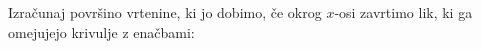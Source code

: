 \documentclass[11pt,a4paper]{exam}
\renewcommand{\geq}{\geqslant}
\renewcommand{\{}{\lbrace}
\renewcommand{\}}{\rbrace}
\begin{document}
\begin{questions}
\question Izračunaj površino vrtenine, ki jo dobimo, če okrog $x$-osi zavrtimo lik, ki ga omejujejo krivulje z enačbami:
	
\end{questions}







\end{document}
